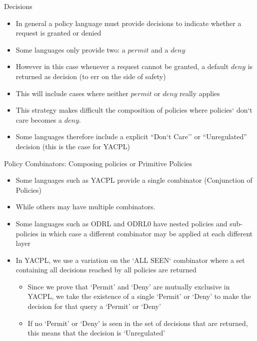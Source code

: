 \documentclass{beamer}
\begin{document}
\begin{frame}[fragile]{Decisions}
\begin{itemize}
\item In general a policy language must provide decisions to indicate whether a request is granted or denied
\item Some languages only provide two: a $permit$ and a $deny$ 
\item However in this case whenever a request cannot be granted, a default $deny$ is returned as decision (to err on the side of safety)
\item This will include cases where neither $permit$ or $deny$ really applies
\item This strategy makes difficult the composition of policies where policies` don`t care becomes a $deny$. 
\item Some languages therefore include a explicit ``Don`t Care'' or ``Unregulated'' decision (this is the case for YACPL) 
\end{itemize}
\end{frame}
\begin{frame}[fragile]{Policy Combinators: Composing policies or Primitive Policies}
\begin{itemize}
\item Some languages such as YACPL provide a single combinator (Conjunction of Policies)
\item While others may have multiple combinators.
\item Some languages such as ODRL and ODRL0 have nested policies and sub-policies in which case a different combinator may be applied at each different layer
\item In YACPL, we use a variation on the `ALL SEEN` combinator where a set containing all decisions reached by all policies are returned
     \begin{itemize}
         \item Since we prove that `Permit' and `Deny' are mutually exclusive in YACPL, we take the existence of a single `Permit' or `Deny' to make the decision for that query a `Permit' or `Deny'
         \item If no `Permit' or `Deny' is seen in the set of decisions that are returned, this means that the decision is `Unregulated'
     \end{itemize}
\end{itemize}
\end{frame}
\end{document}
